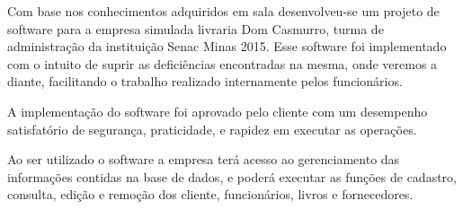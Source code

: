 \begin {resumo}

Com base nos conhecimentos adquiridos em sala desenvolveu-se um projeto de  software para a empresa simulada livraria Dom Casmurro, turma de administração da instituição Senac Minas 2015. Esse software foi implementado com o intuito de suprir as deficiências encontradas na mesma, onde veremos a diante, facilitando o trabalho realizado internamente pelos funcionários.

A implementação do software foi aprovado pelo cliente com um desempenho satisfatório de segurança, praticidade, e rapidez em executar as operações.

Ao ser utilizado o software a empresa terá acesso ao gerenciamento das informações contidas na base de dados, e poderá executar as funções de cadastro, consulta, edição e remoção dos cliente, funcionários, livros e fornecedores. 

\end{resumo}	
